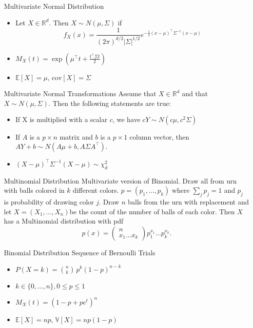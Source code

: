 \documentclass[avery5371,grid]{flashcards}
\begin{document}
\begin{flashcard}[Definition]{Multivariate Normal Distribution}
\begin{itemize}
\item Let $X \in \mathbb{R}^d$. Then $X \sim N(\mu, \Sigma)$ if 
\[
f_X(x) = \frac{1}{(2\pi)^{d/2}|\Sigma|^{1/2}} e^{-\frac{1}{2}(x-\mu)^\intercal \Sigma^{-1} (x-\mu)}
\]
\item $M_{X}\left(t\right) = \exp \left(\mu^\intercal t + \frac{t^\intercal \Sigma t}{2} \right)$
\item $\mathbb{E} \left[ X \right] = \mu$, $\text{cov}\left[X\right]= \Sigma$
\end{itemize}
\end{flashcard}

\begin{flashcard}[Theorem]{Multivariate Normal Transformations}
Assume that $X \in \mathbb{R}^d$ and that $X \sim N(\mu, \Sigma)$. Then the following statements
are true:
\begin{itemize}
\item If X is multiplied with a scalar $c$, we have
$cY \sim N(c\mu,c^2\Sigma)$
\item If $A$ is a $p \times n$ matrix and $b$ is a $p \times 1$ column vector, then 
$AY + b \sim N(A\mu + b, A\Sigma A^\intercal).$
\item $(X-\mu)^\intercal \Sigma^{-1} (X - \mu) \sim \chi_d^2$
\end{itemize}
\end{flashcard}


\begin{flashcard}[Definition]{Multinomial Distribution}
Multivariate version of Binomial. Draw all from urn with balls colored
in $k$ different colors. $p=\left(p_{1},\ldots,p_{k}\right)$ where
$\sum_{j}p_{j}=1$ and $p_{j}$ is probability of drawing color $j$.
Draw $n$ balls from the urn with replacement and let $X=\left(X_{1},\ldots,X_{n}\right)$be
the count of the number of balls of each color. Then $X$ has a Multinomial
distribution with pdf 
\[
p\left(x\right)=\left(\begin{array}{c}
n\\
x_{1}\ldots x_{k}
\end{array}\right)p_{1}^{x_{1}}\ldots p_{k}^{x_{k}}.
\]
\end{flashcard}

\begin{flashcard}[Definition]{Binomial Distribution}
Sequence of Bernoulli Trials
\begin{itemize}
\item $P\left(X=k\right)=\textstyle {n \choose k}\, p^k (1-p)^{n-k}$
\item $k \in \{ 0, \ldots, n \},0\le p \le 1$
\item $M_{X}\left(t\right)= (1-p + p e^t)^n \!$
\item $\mathbb{E}\left[X\right]=np$, $\mathbb{V}\left[X\right]=np\left(1-p\right)$
\end{itemize}
\end{flashcard}
\end{document}
